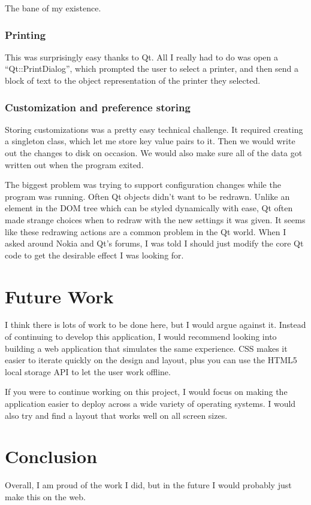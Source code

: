 \documentclass[10pt]{article}
\begin{document}
The bane of my existence.

\subsubsection{Printing}

This was surprisingly easy thanks to Qt. All I really had to do was open a ``Qt::PrintDialog'', which prompted the user to select a printer, and then send a block of text to the object representation of the printer they selected.

\subsubsection{Customization and preference storing}

Storing customizations was a pretty easy technical challenge. It required creating a singleton class, which let me store key value pairs to it. Then we would write out the changes to disk on occasion. We would also make sure all of the data got written out when the program exited.

The biggest problem was trying to support configuration changes while the program was running. Often Qt objects didn't want to be redrawn. Unlike an element in the DOM tree which can be styled dynamically with ease, Qt often made strange choices when to redraw with the new settings it was given. It seems like these redrawing actions are a common problem in the Qt world. When I asked around Nokia and Qt's forums, I was told I should just modify the core Qt code to get the desirable effect I was looking for.

\section{Future Work}

I think there is lots of work to be done here, but I would argue against it. Instead of continuing to develop this application, I would recommend looking into building a web application that simulates the same experience. CSS makes it easier to iterate quickly on the design and layout, plus you can use the HTML5 local storage API to let the user work offline.

If you were to continue working on this project, I would focus on making the application easier to deploy across a wide variety of operating systems. I would also try and find a layout that works well on all screen sizes.

\section{Conclusion}

Overall, I am proud of the work I did, but in the future I would probably just make this on the web.

\newpage
{}
\nocite{*}


\end{document}
